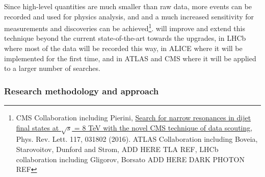 Since high-level quantities are much smaller than raw data, more events can be recorded and used for physics analysis, and and a much increased sensitivity for measurements and discoveries can be achieved\footnote{CMS Collaboration including Pierini, \href{https://arxiv.org/abs/1604.08907}{Search for narrow resonances in dijet final states at $\sqrt{s}$ = 8 TeV with the novel CMS technique of data scouting}, Phys. Rev. Lett. 117, 031802 (2016). ATLAS Collaboration including Boveia, Starovoitov, Dunford and Strom, ADD HERE TLA REF, LHCb collaboration including Gligorov, Borsato ADD HERE DARK PHOTON REF}. 
\acronym will improve and extend this technique beyond the current state-of-the-art towards the upgrades, in LHCb where most of the data will be recorded this way, in ALICE where it will be implemented for the first time, and in ATLAS and CMS where it will be applied to a larger number of searches. 
\begin{center}
\vskip-15pt
\end{center}


\subsubsection{Research methodology and approach}
\label{sec:metho}


